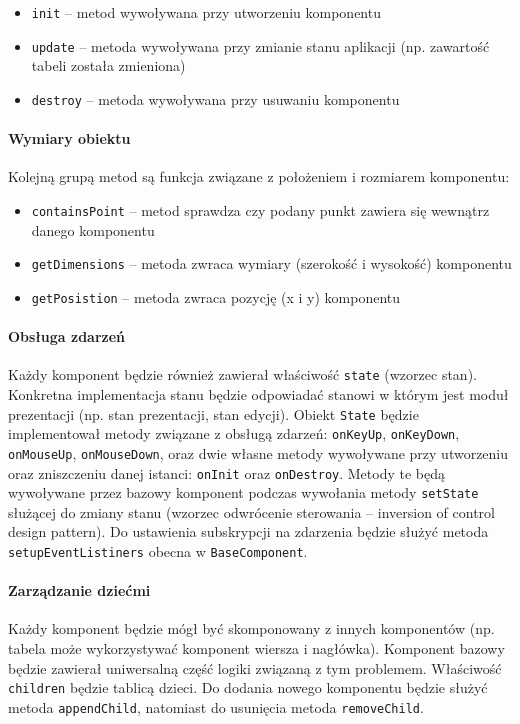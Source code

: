 \documentclass{article}
\def\code#1{\texttt{#1}}
\begin{document}
\begin{itemize}
    \item \code{init} -- metod wywoływana przy utworzeniu komponentu
    \item \code{update} -- metoda wywoływana przy zmianie stanu aplikacji (np. zawartość tabeli została zmieniona)
    \item \code{destroy} -- metoda wywoływana przy usuwaniu komponentu
\end{itemize}

\paragraph{Wymiary obiektu} Kolejną grupą metod są funkcja związane z położeniem i rozmiarem komponentu:

\begin{itemize}
    \item \code{containsPoint} -- metod sprawdza czy podany punkt zawiera się wewnątrz danego komponentu
    \item \code{getDimensions} -- metoda zwraca wymiary (szerokość i wysokość) komponentu
    \item \code{getPosistion} -- metoda zwraca pozycję (x i y) komponentu
\end{itemize}

\paragraph{Obsługa zdarzeń}
\label{p:eventsHandling}
Każdy komponent będzie również zawierał właściwość \code{state} (wzorzec stan). Konkretna implementacja stanu będzie odpowiadać stanowi w którym jest moduł prezentacji (np. stan prezentacji, stan edycji). Obiekt \code{State} będzie implementował metody związane z obsługą zdarzeń: \code{onKeyUp}, \code{onKeyDown}, \code{onMouseUp}, \code{onMouseDown}, oraz dwie własne metody wywoływane przy utworzeniu oraz zniszczeniu danej istanci: \code{onInit} oraz \code{onDestroy}. Metody te będą wywoływane przez bazowy komponent podczas wywołania metody \code{setState} służącej do zmiany stanu (wzorzec odwrócenie sterowania -- inversion of control design pattern). Do ustawienia subskrypcji na zdarzenia będzie służyć metoda \code{setupEventListiners} obecna w \code{BaseComponent}.

\paragraph{Zarządzanie dziećmi}
Każdy komponent będzie mógł być skomponowany z innych komponentów  (np. tabela może wykorzystywać komponent wiersza i nagłówka). Komponent bazowy będzie zawierał uniwersalną część logiki związaną z tym problemem. Właściwość \code{children} będzie tablicą dzieci. Do dodania nowego komponentu będzie służyć metoda \code{appendChild}, natomiast do usunięcia metoda \code{removeChild}.
\end{document}
